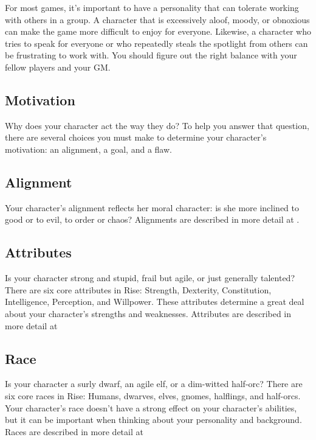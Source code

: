         For most games, it's important to have a personality that can tolerate working with others in a group.
        A character that is excessively aloof, moody, or obnoxious can make the game more difficult to enjoy for everyone.
        Likewise, a character who tries to speak for everyone or who repeatedly steals the spotlight from others can be frustrating to work with.
        You should figure out the right balance with your fellow players and your GM.\@

    \subsection{Motivation}

        Why does your character act the way they do?
        To help you answer that question, there are several choices you must make to determine your character's motivation: an alignment, a goal, and a flaw.

    \subsection{Alignment}

        Your character's alignment reflects her moral character: is she more inclined to good or to evil, to order or chaos?
        Alignments are described in more detail at .

    \subsection{Attributes}
        Is your character strong and stupid, frail but agile, or just generally talented?
        There are six core attributes in Rise: Strength, Dexterity, Constitution, Intelligence, Perception, and Willpower.
        These attributes determine a great deal about your character's strengths and weaknesses.
        Attributes are described in more detail at 

    \subsection{Race}
        Is your character a surly dwarf, an agile elf, or a dim-witted half-orc?
        There are six core races in Rise: Humans, dwarves, elves, gnomes, halflings, and half-orcs.
        Your character's race doesn't have a strong effect on your character's abilities, but it can be important when thinking about your personality and background.
        Races are described in more detail at 

